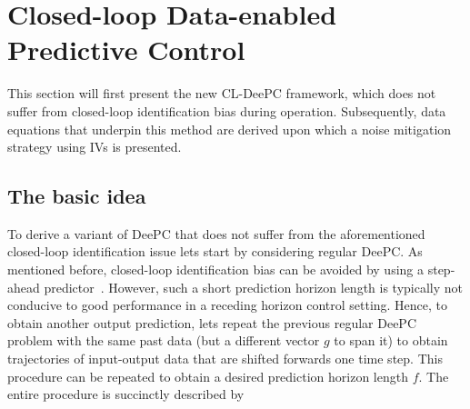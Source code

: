 \section{Closed-loop Data-enabled Predictive Control}
This section will first present the new \ac{CL-DeePC} framework, which does not suffer from closed-loop identification bias during operation. Subsequently, data equations that underpin this method are derived upon which a noise mitigation strategy using \ac{IVs} is presented.

\subsection{The basic idea}
To derive a variant of \ac{DeePC} that does not suffer from the aforementioned closed-loop identification issue lets start by considering regular \ac{DeePC}. As mentioned before, closed-loop identification bias can be avoided by using a step-ahead predictor~\cite{Ljung1996}. However, such a short prediction horizon length is typically not conducive to good performance in a receding horizon control setting. Hence, to obtain another output prediction, lets repeat the previous regular \ac{DeePC} problem with the same past data (but a different vector $g$ to span it) to obtain trajectories of input-output data that are shifted forwards one time step. This procedure can be repeated to obtain a desired prediction horizon length $f$. The entire procedure is succinctly described by
% 
% 
